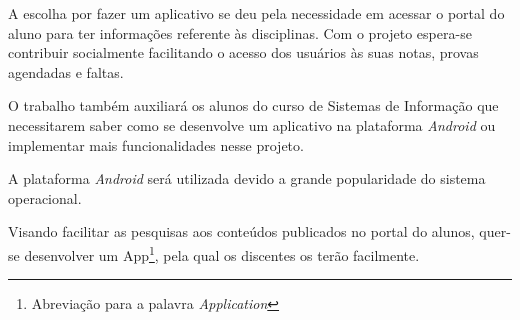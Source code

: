 	\par A escolha por fazer um aplicativo se deu pela necessidade em acessar o
portal do aluno para ter informações referente às disciplinas. Com o projeto 
espera-se contribuir socialmente facilitando o acesso dos usuários às suas notas, 
provas agendadas e faltas.

	\par O trabalho também auxiliará os alunos do curso de Sistemas de Informação
que necessitarem saber como se desenvolve um aplicativo na plataforma
\textit{Android} ou implementar mais funcionalidades nesse projeto.

	\par A plataforma \textit{Android} será utilizada devido a grande popularidade
do sistema operacional.

	\par Visando facilitar as pesquisas aos conteúdos publicados no portal do
alunos, quer-se desenvolver um App\footnote{Abreviação para a palavra \textit{Application}},
pela qual os discentes os terão facilmente.
